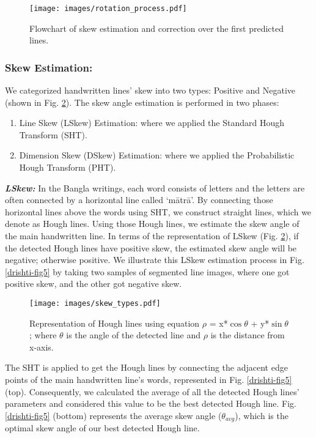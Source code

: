 \documentclass[runningheads]{llncs}
\begin{document}
\begin{figure}[h]
\centering
\texttt{[image: images/rotation\_process.pdf]}
\vspace{-2mm}
\caption{Flowchart of skew estimation and correction over the first predicted lines.}
\label{drishti-fig3}
\vspace{-6mm}
\end{figure}

\subsubsection{Skew Estimation:}

We categorized handwritten lines' skew into two types: Positive and Negative (shown in Fig. \ref{drishti-fig4}). The skew angle estimation is performed in two phases:
\begin{enumerate}
    \item Line Skew (LSkew) Estimation: where we applied the Standard Hough Transform (SHT).
    \item Dimension Skew (DSkew) Estimation: where we applied the Probabilistic Hough Transform (PHT).
\end{enumerate}

\noindent \textbf{\textit{LSkew:}} In the Bangla writings, each word consists of letters and the letters are often connected by a horizontal line called ‘mātrā’. By connecting those horizontal lines above the words using SHT, we construct straight lines, which we denote as Hough lines. Using those Hough lines, we estimate the skew angle of the main handwritten line. In terms of the representation of LSkew (Fig. \ref{drishti-fig4}), if the detected Hough lines have positive skew, the estimated skew angle will be negative; otherwise positive. We illustrate this LSkew estimation process in Fig. \ref{drishti-fig5} by taking two samples of segmented line images, where one got positive skew, and the other got negative skew. 

\begin{figure}
\centering
\texttt{[image: images/skew\_types.pdf]}
\vspace{-6mm}
\caption{Representation of Hough lines using equation $\rho$ = x*$\cos\theta$ + y*$\sin\theta$; where $\theta$ is the angle of the detected line and $\rho$ is the distance from x-axis.} 
\label{drishti-fig4}
\vspace{-4mm}
\end{figure} 

The SHT is applied to get the Hough lines by connecting the adjacent edge points of the main handwritten line’s words, represented in Fig. \ref{drishti-fig5} (top). Consequently, we calculated the average of all the detected Hough lines' parameters and considered this value to be the best detected Hough line. Fig. \ref{drishti-fig5} (bottom) represents the average skew angle ($\theta_{avg}$), which is the optimal skew angle of our best detected Hough line.
\end{document}
